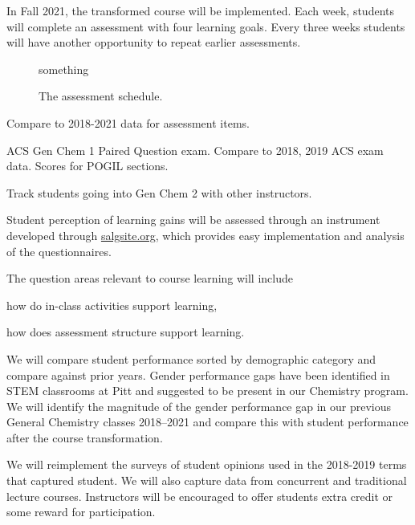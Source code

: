 \documentclass[10pt,letterpaper]{article}
\begin{document}
In Fall 2021, the transformed course will be implemented. Each week, students will complete an assessment with four learning goals. Every three weeks students will have another opportunity to repeat earlier assessments.

\begin{wrapfigure}{R}{0pt}
something
\caption{\label{fig:schedule}
The assessment schedule.}
\end{wrapfigure}


%
%


 Compare to 2018-2021 data for assessment items.

 ACS Gen Chem 1 Paired Question exam.  Compare to 2018, 2019 ACS exam data. Scores for POGIL sections.

 Track students going into Gen Chem 2 with other instructors. 

Student perception of learning gains will be assessed through an instrument developed through \url{salgsite.org}, which provides easy implementation and analysis of the questionnaires. 

The question areas relevant to course learning will include
\begin{enumerate*}[label=\textbf{\arabic*.)}]
  \item how do in-class activities support learning,
\item how does assessment structure support learning.
\end{enumerate*}

 We will compare student performance sorted by demographic category and compare against prior years. Gender performance gaps have been identified in STEM classrooms at Pitt and suggested to be present in our Chemistry program. We will identify the magnitude of the gender performance gap in our previous General Chemistry classes 2018--2021 and compare this with student performance after the course transformation.

We will reimplement the surveys of student opinions used in the 2018-2019 terms that captured student.
We will also capture data from concurrent \pogil and traditional lecture courses. Instructors will be encouraged to offer students extra credit or some reward for participation.
\end{document}
